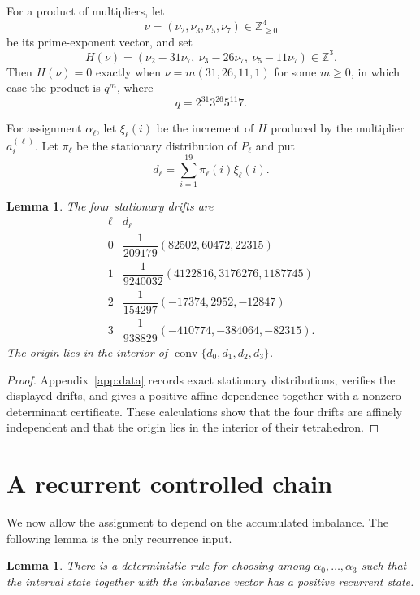 \documentclass[11pt,a4paper]{amsart}
\newtheorem{lemma}[theorem]{Lemma}
\newcommand{\Z}{\mathbb Z}
\begin{document}
For a product of multipliers, let
\[
 \nu=(\nu_2,\nu_3,\nu_5,\nu_7)\in\Z_{\ge0}^4
\]
be its prime-exponent vector, and set
\[
 H(\nu)=(\nu_2-31\nu_7,\ \nu_3-26\nu_7,\ \nu_5-11\nu_7)\in\Z^3.
\]
Then $H(\nu)=0$ exactly when $\nu=m(31,26,11,1)$ for some $m\ge0$, in which case the product is $q^m$, where
\[
 q=2^{31}3^{26}5^{11}7.
\]

For assignment $\alpha_\ell$, let $\xi_\ell(i)$ be the increment of $H$ produced by the multiplier $a_i^{(\ell)}$. Let $\pi_\ell$ be the stationary distribution of $P_\ell$ and put
\[
 d_\ell=\sum_{i=1}^{19}\pi_\ell(i)\xi_\ell(i).
\]

\begin{lemma}\label{lem:finite-data}
The four stationary drifts are
\[
\begin{array}{c|c}
\ell&d_\ell\\ \hline
0&\dfrac1{209179}(82502,60472,22315)\\[4pt]
1&\dfrac1{9240032}(4122816,3176276,1187745)\\[4pt]
2&\dfrac1{154297}(-17374,2952,-12847)\\[4pt]
3&\dfrac1{938829}(-410774,-384064,-82315).
\end{array}
\]
The origin lies in the interior of $\operatorname{conv}\{d_0,d_1,d_2,d_3\}$.
\end{lemma}

\begin{proof}
Appendix~\ref{app:data} records exact stationary distributions, verifies the displayed drifts, and gives a positive affine dependence together with a nonzero determinant certificate. These calculations show that the four drifts are affinely independent and that the origin lies in the interior of their tetrahedron.
\end{proof}

\section{A recurrent controlled chain}

We now allow the assignment to depend on the accumulated imbalance. The following lemma is the only recurrence input.

\begin{lemma}\label{lem:recurrence}
There is a deterministic rule for choosing among $\alpha_0,\ldots,\alpha_3$ such that the interval state together with the imbalance vector has a positive recurrent state.
\end{lemma}
\end{document}
